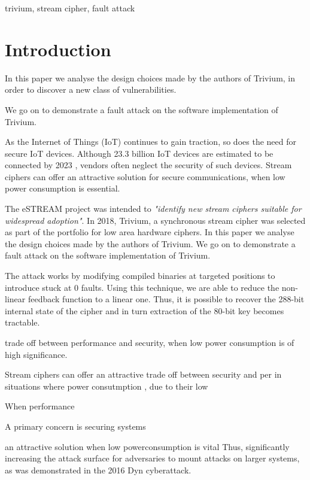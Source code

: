 \documentclass[conference]{IEEEtran}
\begin{document}
\begin{IEEEkeywords}
trivium, stream cipher, fault attack
\end{IEEEkeywords}

\section{Introduction}




In this paper we analyse the design choices made by the authors of Trivium, in order to discover a new class of vulnerabilities. 


We go on to demonstrate a fault attack on the software implementation of Trivium.

As the Internet of Things (IoT) continues to gain traction, so does the need for secure IoT devices. Although 23.3 billion IoT devices are estimated to be connected by 2023 \cite{iot}, vendors often neglect the security of such devices. Stream ciphers can offer an attractive solution for secure communications, when low power consumption is essential. 

The eSTREAM project was intended to \textit{"identify new stream ciphers suitable for widespread adoption"}.\cite{call} In 2018, Trivium, a synchronous stream cipher was selected as part of the portfolio for low area hardware ciphers. In this paper we analyse the design choices made by the authors of Trivium. We go on to demonstrate a fault attack on the software implementation of Trivium. 

The attack works by modifying compiled binaries at targeted positions to introduce stuck at 0 faults. Using this technique, we are able to reduce the non-linear feedback function to a linear one. Thus, it is possible to recover the 288-bit internal state of the cipher and in turn extraction of the 80-bit key becomes tractable.


trade off between performance and security, when low power consumption is of high significance. 


Stream ciphers can offer an attractive trade off between security and per in situations where power consutmption 
, due to their low


When performance 

A primary concern is securing systems 

an attractive solution when low powerconsumption is vital 
Thus, significantly increasing the attack surface for adversaries to mount attacks on larger systems, as was demonstrated in the 2016 Dyn cyberattack.
\end{document}
